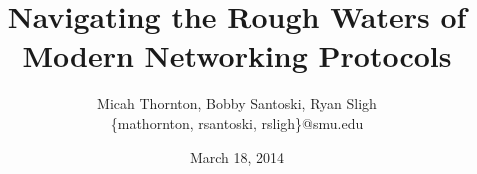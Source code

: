 \title{Navigating the Rough Waters of Modern Networking Protocols}
\date{March 18, 2014}
\author{Micah Thornton, Bobby Santoski, Ryan Sligh \\ \small{\{mathornton, rsantoski, rsligh\}@smu.edu}}
\maketitle
